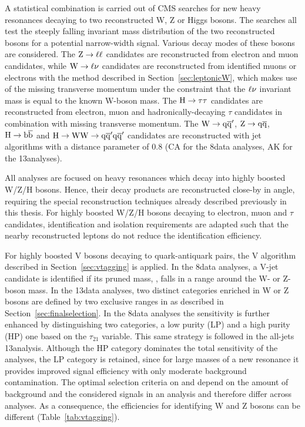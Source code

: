 A statistical combination is carried out of CMS searches for new heavy resonances decaying to two reconstructed W, Z or Higgs bosons.
The searches all test the steeply falling invariant mass distribution of the two reconstructed bosons for a potential narrow-width signal.
Various decay modes of these bosons are considered.
The $\mathrm{Z}\to\ell\ell$ candidates are reconstructed from electron and muon candidates, while $\mathrm{W}\to\ell\nu$ candidates are reconstructed from identified muons or electrons with the method described in Section~\ref{sec:leptonicW}, which makes use of the missing transverse momentum under the constraint that the $\ell\nu$ invariant mass is equal to the known W-boson mass.
The $\mathrm{H}\to\tau\tau$ candidates are reconstructed from electron, muon and hadronically-decaying $\tau$ candidates in combination with missing transverse momentum.
The $\mathrm{W}\to\mathrm{q}\overline{\mathrm{q}}'$, $\mathrm{Z}\to\mathrm{q}\overline{\mathrm{q}}$, $\mathrm{H}\to{\mathrm{b}\overline{\mathrm{b}}}$ and $\mathrm{H}\to\mathrm{W}\mathrm{W}\to\mathrm{q}\overline{\mathrm{q}}^\prime\mathrm{q}\overline{\mathrm{q}}^\prime$ candidates are reconstructed with jet algorithms with a distance parameter of 0.8 (CA for the 8\TeV data analyses, AK for the 13\TeV analyses). 

All analyses are focused on heavy resonances which decay into highly boosted W/Z/H bosons. Hence, their decay products are reconstructed close-by in angle, requiring the special reconstruction techniques already described previously in this thesis. For highly boosted W/Z/H bosons decaying to electron, muon and $\tau$ candidates, identification and isolation requirements are adapted such that the nearby reconstructed leptons do not reduce the identification efficiency.

For highly boosted V bosons decaying to quark-antiquark pairs, the V algorithm described in Section~\ref{sec:vtagging} is applied.
In the 8\TeV data analyses, a V-jet candidate is identified if its pruned mass, \mJ, falls in a range around the W- or Z-boson mass.
In the 13\TeV data analyses, two distinct categories enriched in W or Z bosons are defined by two exclusive ranges in \mJ as described in Section~\ref{sec:finalselection}.
In the 8\TeV data analyses the sensitivity is further enhanced by distinguishing two categories, a low purity (LP) and a high purity (HP) one based on the $\tau_{21}$ variable.
This same strategy is followed in the all-jets 13\TeV analysis. Although the HP category dominates the total sensitivity of the analyses, the LP category is retained,
since for large masses of a new resonance it provides improved signal efficiency with only moderate background contamination.
The optimal selection criteria on \mJ and \nsubj depend on the amount of background and the considered signals in an analysis and therefore differ across analyses.
As a consequence, the efficiencies for identifying W and Z bosons can be different (Table~\ref{tab:vtagging}).

